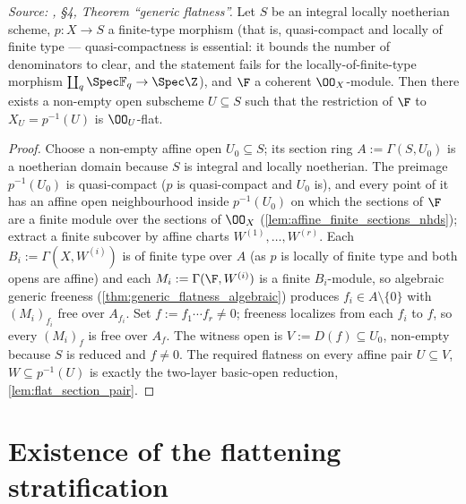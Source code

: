 \begin{theorem}
  \leanok
  \label{thm:generic_flatness}
  \textit{Source: \cite{nitsure-hilbert-quot}, \S4, Theorem ``generic flatness''.}
  Let \(S\) be an integral locally noetherian scheme, \(p : X \to S\) a
  finite-type morphism (that is, quasi-compact and locally of finite type —
  quasi-compactness is essential: it bounds the number of denominators to
  clear, and the statement fails for the locally-of-finite-type morphism
  \(\coprod_q \Spec \mathbb{F}_q \to \Spec \Z\)), and \(\F\) a coherent
  \(\OO_X\)-module. Then there exists a non-empty open subscheme
  \(U \subseteq S\) such that the restriction of \(\F\) to
  \(X_U = p^{-1}(U)\) is \(\OO_U\)-flat.
\end{theorem}

\begin{proof}
  \leanok
  Choose a non-empty affine open \(U_0 \subseteq S\); its section ring
  \(A := \Gamma(S, U_0)\) is a noetherian domain because \(S\) is integral and
  locally noetherian. The preimage \(p^{-1}(U_0)\) is quasi-compact
  (\(p\) is quasi-compact and \(U_0\) is), and every point of it has an
  affine open neighbourhood inside \(p^{-1}(U_0)\) on which the sections of
  \(\F\) are a finite module over the sections of \(\OO_X\)
  (\cref{lem:affine_finite_sections_nhds}); extract a finite subcover by
  affine charts \(W^{(1)}, \dots, W^{(r)}\). Each
  \(B_i := \Gamma(X, W^{(i)})\) is of finite type over \(A\) (as \(p\) is
  locally of finite type and both opens are affine) and each
  \(M_i := \Gamma(\F, W^{(i)})\) is a finite \(B_i\)-module, so algebraic
  generic freeness (\cref{thm:generic_flatness_algebraic}) produces
  \(f_i \in A \setminus \{0\}\) with \((M_i)_{f_i}\) free over \(A_{f_i}\).
  Set \(f := f_1 \cdots f_r \ne 0\); freeness localizes from each \(f_i\) to
  \(f\), so every \((M_i)_f\) is free over \(A_f\). The witness open is
  \(V := D(f) \subseteq U_0\), non-empty because \(S\) is reduced and
  \(f \ne 0\). The required flatness on every affine pair
  \(U \subseteq V\), \(W \subseteq p^{-1}(U)\) is exactly the two-layer
  basic-open reduction, \cref{lem:flat_section_pair}.
\end{proof}

\section{Existence of the flattening stratification}
\label{sec:flatstrat_exists}

